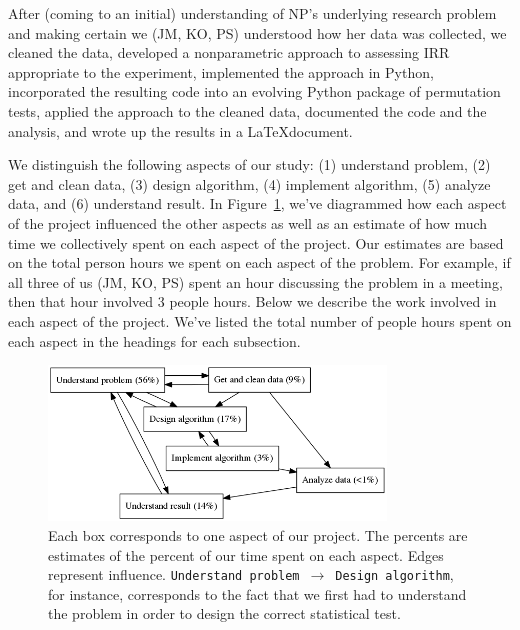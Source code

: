 \documentclass[]{article}
\begin{document}
After (coming to an initial) understanding of NP's underlying research problem
and making certain we (JM, KO, PS) understood how her data was collected, we
cleaned the data, developed a nonparametric approach to assessing IRR
appropriate to the experiment, implemented the approach in Python, incorporated
the resulting code into an evolving Python package of permutation tests,
applied the approach to the cleaned data, documented the code and the analysis,
and wrote up the results in a \LaTeX document. 

We distinguish the following aspects of our study:
(1) understand problem,
(2) get and clean data,
(3) design algorithm,
(4) implement algorithm,
(5) analyze data, and
(6) understand result.
In Figure~\ref{fig:work_process}, we've diagrammed how each aspect of the
project influenced the other aspects as well as an estimate of how much time
we collectively spent on each aspect of the project.
Our estimates are based on the total person hours we spent on each aspect of
the problem.
For example, if all three of us (JM, KO, PS) spent an hour discussing the
problem in a meeting, then that hour involved 3 people hours.
Below we describe the work involved in each aspect of the project.
We've listed the total number of people hours spent on each aspect in the
headings for each subsection.

\begin{figure}[h]
  \centering
    \includegraphics[width=0.8\textwidth]{work_process.png}
  \caption{
  \small
    Each box corresponds to one aspect of our project.
    The percents are estimates of the percent of our time spent on each aspect.
    Edges represent influence.
    \texttt{Understand problem}~$\to$~\texttt{Design algorithm}, for instance,
    corresponds to the fact that we first had to understand the problem
    in order to design the correct statistical test.\label{fig:work_process}}
\end{figure}
\end{document}

